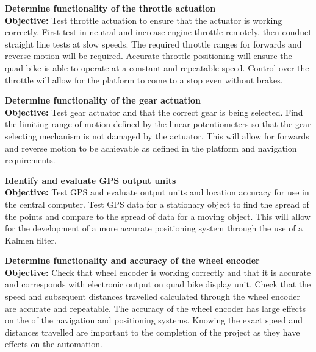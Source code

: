 \documentclass[main.tex]{subfiles}
\begin{document}
\begin{appendices}
\begin{qb}
\end{qb}

\begin{qb}
\textbf{Determine functionality of the throttle actuation}\\
\textbf{Objective:} Test throttle actuation to ensure that the actuator is working correctly. First test in neutral and increase engine throttle remotely, then conduct straight line tests at slow speeds. The required throttle ranges for forwards and reverse motion will be required. Accurate throttle positioning will ensure the quad bike is able to operate at a constant and repeatable speed. Control over the throttle will allow for the platform to come to a stop even without brakes.

\end{qb}

\begin{qb}
\textbf{Determine functionality of the gear actuation}\\
\textbf{Objective:} Test gear actuator and that the  correct gear is being selected. Find the limiting range of motion defined by the linear potentiometers so that the gear selecting mechanism is not damaged by the actuator. This will allow for forwards and reverse motion to be achievable as defined in the platform and navigation requirements.  

\end{qb}

\begin{qb}
\textbf{Identify and evaluate GPS output units}\\
\textbf{Objective:} Test GPS and evaluate output units and location accuracy for use in the central computer. Test GPS data for a stationary object to find the spread of the points and compare to the spread of data for a moving object. This will allow for the development of a more accurate positioning system through the use of a Kalmen filter.

\end{qb}

\begin{qb}
\textbf{Determine functionality and accuracy of the wheel encoder}\\
\textbf{Objective:} Check that wheel encoder is working correctly and that it is accurate and corresponds with electronic output on quad bike display unit. Check that the speed and subsequent distances travelled calculated through the wheel encoder are accurate and repeatable. The accuracy of the wheel encoder has large effects on the of the navigation and positioning systems. Knowing the exact speed and distances travelled are important to the completion of the project as they have effects on the automation. 


\end{qb}
\end{appendices}
\end{document}
